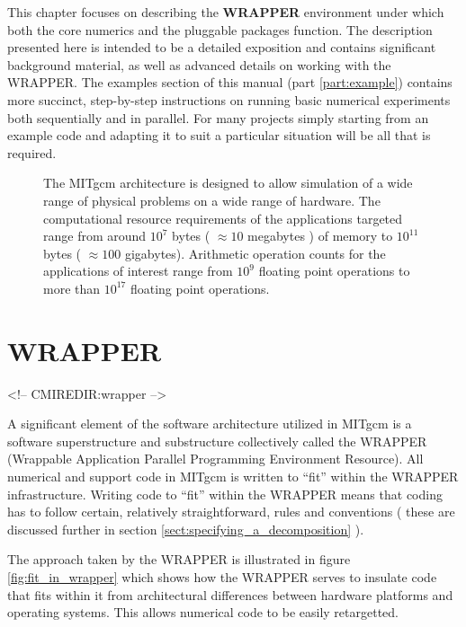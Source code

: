 This chapter focuses on describing the {\bf WRAPPER} environment under which
both the core numerics and the pluggable packages function. The description
presented here is intended to be a detailed exposition and contains significant
background material, as well as advanced details on working with the WRAPPER. 
The examples section of this manual (part \ref{part:example}) contains more
succinct, step-by-step instructions on running basic numerical
experiments both sequentially and in parallel. For many projects simply 
starting from an example code and adapting it to suit a particular situation 
will be all that is required.


\begin{figure}
\begin{center}
\end{center}
\caption{
The MITgcm architecture is designed to allow simulation of a wide 
range of physical problems on a wide range of hardware. The computational 
resource requirements of the applications targeted range from around 
$10^7$ bytes ( $\approx 10$ megabytes ) of memory to $10^{11}$ bytes
( $\approx 100$ gigabytes). Arithmetic operation counts for the applications of 
interest range from $10^{9}$ floating point operations to more than $10^{17}$ 
floating point operations.}
\label{fig:mitgcm_architecture_goals}
\end{figure}

\section{WRAPPER}
\begin{rawhtml}
<!-- CMIREDIR:wrapper -->
\end{rawhtml}

A significant element of the software architecture utilized in
MITgcm is a software superstructure and substructure collectively
called the WRAPPER (Wrappable Application Parallel Programming 
Environment Resource). All numerical and support code in MITgcm is written 
to ``fit'' within the WRAPPER infrastructure. Writing code to ``fit'' within 
the WRAPPER means that coding has to follow certain, relatively
straightforward, rules and conventions ( these are discussed further in 
section \ref{sect:specifying_a_decomposition} ).

The approach taken by the WRAPPER is illustrated in figure 
\ref{fig:fit_in_wrapper} which shows how the WRAPPER serves to insulate code 
that fits within it from architectural differences between hardware platforms 
and operating systems. This allows numerical code to be easily retargetted. 


